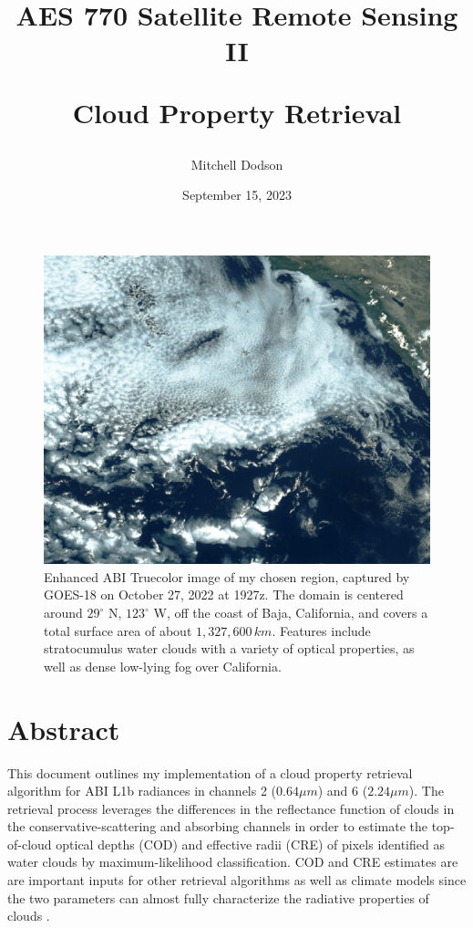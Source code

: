 \documentclass[12pt]{article}
\title{AES 770 Satellite Remote Sensing II

Cloud Property Retrieval}
\author{Mitchell Dodson}
\date{September 15, 2023}
\begin{document}
\maketitle

\vspace{-2em}

\begin{figure}[h!]
    \centering
    \includegraphics[width=.6\paperwidth]{figs/region-tc.png}
    \caption{Enhanced ABI Truecolor image of my chosen region, captured by GOES-18 on October 27, 2022 at 1927z. The domain is centered around $29^\circ$ N, $123^\circ$ W, off the coast of Baja, California, and covers a total surface area of about $1,327,600\,\si{km}$. Features include stratocumulus water clouds with a variety of optical properties, as well as dense low-lying fog over California.}
    \label{title_image}
\end{figure}

\section{Abstract}

This document outlines my implementation of a cloud property retrieval algorithm for ABI L1b radiances in channels 2 ($0.64\mu m$) and 6 ($2.24\mu m$). The retrieval process leverages the differences in the reflectance function of clouds in the conservative-scattering and absorbing channels in order to estimate the top-of-cloud optical depths (COD) and effective radii (CRE) of pixels identified as water clouds by maximum-likelihood classification. COD and CRE estimates are are important inputs for other retrieval algorithms as well as climate models since the two parameters can almost fully characterize the radiative properties of clouds \cite{slingo_gcm_1989}.
\end{document}
